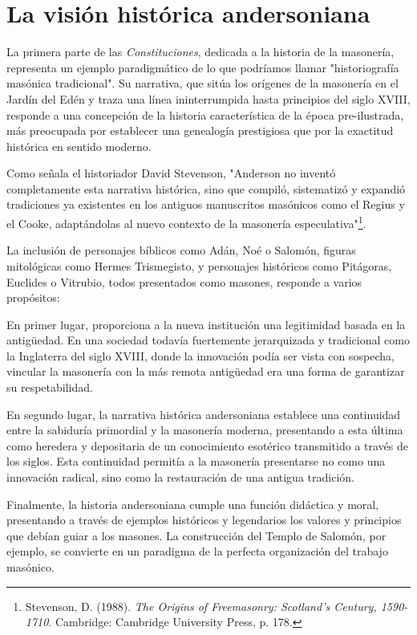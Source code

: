 \documentclass[a4paper,12pt,twoside]{book}
\begin{document}
\section{La visión histórica andersoniana}

La primera parte de las \textit{Constituciones}, dedicada a la historia de la masonería, representa un ejemplo paradigmático de lo que podríamos llamar "historiografía masónica tradicional". Su narrativa, que sitúa los orígenes de la masonería en el Jardín del Edén y traza una línea ininterrumpida hasta principios del siglo XVIII, responde a una concepción de la historia característica de la época pre-ilustrada, más preocupada por establecer una genealogía prestigiosa que por la exactitud histórica en sentido moderno.

Como señala el historiador David Stevenson, "Anderson no inventó completamente esta narrativa histórica, sino que compiló, sistematizó y expandió tradiciones ya existentes en los antiguos manuscritos masónicos como el Regius y el Cooke, adaptándolas al nuevo contexto de la masonería especulativa"\footnote{Stevenson, D. (1988). \textit{The Origins of Freemasonry: Scotland's Century, 1590-1710}. Cambridge: Cambridge University Press, p. 178.}.

La inclusión de personajes bíblicos como Adán, Noé o Salomón, figuras mitológicas como Hermes Trismegisto, y personajes históricos como Pitágoras, Euclides o Vitrubio, todos presentados como masones, responde a varios propósitos:

En primer lugar, proporciona a la nueva institución una legitimidad basada en la antigüedad. En una sociedad todavía fuertemente jerarquizada y tradicional como la Inglaterra del siglo XVIII, donde la innovación podía ser vista con sospecha, vincular la masonería con la más remota antigüedad era una forma de garantizar su respetabilidad.

En segundo lugar, la narrativa histórica andersoniana establece una continuidad entre la sabiduría primordial y la masonería moderna, presentando a esta última como heredera y depositaria de un conocimiento esotérico transmitido a través de los siglos. Esta continuidad permitía a la masonería presentarse no como una innovación radical, sino como la restauración de una antigua tradición.

Finalmente, la historia andersoniana cumple una función didáctica y moral, presentando a través de ejemplos históricos y legendarios los valores y principios que debían guiar a los masones. La construcción del Templo de Salomón, por ejemplo, se convierte en un paradigma de la perfecta organización del trabajo masónico.
\end{document}
